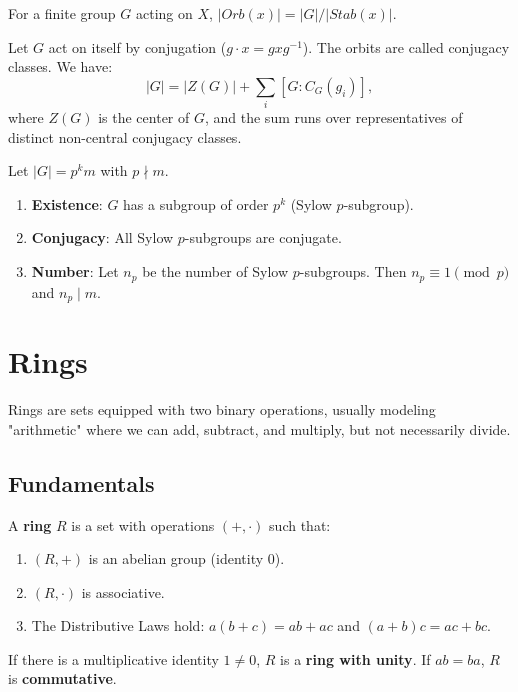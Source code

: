 \documentclass[oneside]{book}
\begin{document}
\begin{theorem}
For a finite group $G$ acting on $X$, $|Orb(x)| = |G| / |Stab(x)|$.
\end{theorem}

\begin{theorem}
Let $G$ act on itself by conjugation ($g \cdot x = gxg^{-1}$). The orbits are called conjugacy classes. We have:
\[ |G| = |Z(G)| + \sum_{i} [G : C_G(g_i)], \]
where $Z(G)$ is the center of $G$, and the sum runs over representatives of distinct non-central conjugacy classes.
\end{theorem}

\begin{theorem}
Let $|G| = p^k m$ with $p \nmid m$.
\begin{enumerate}
    \item \textbf{Existence}: $G$ has a subgroup of order $p^k$ (Sylow $p$-subgroup).
    \item \textbf{Conjugacy}: All Sylow $p$-subgroups are conjugate.
    \item \textbf{Number}: Let $n_p$ be the number of Sylow $p$-subgroups. Then $n_p \equiv 1 \pmod p$ and $n_p \mid m$.
\end{enumerate}
\end{theorem}

\section{Rings}

Rings are sets equipped with two binary operations, usually modeling "arithmetic" where we can add, subtract, and multiply, but not necessarily divide.

\subsection{Fundamentals}

\begin{definition}[Ring]
A \textbf{ring} $R$ is a set with operations $(+, \cdot)$ such that:
\begin{enumerate}
    \item $(R, +)$ is an abelian group (identity $0$).
    \item $(R, \cdot)$ is associative.
    \item The Distributive Laws hold: $a(b+c) = ab + ac$ and $(a+b)c = ac + bc$.
\end{enumerate}
If there is a multiplicative identity $1 \neq 0$, $R$ is a \textbf{ring with unity}. If $ab=ba$, $R$ is \textbf{commutative}.
\end{definition}
\end{document}
